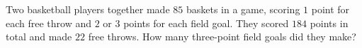 Two basketball players together made $85$ baskets in a game, scoring $1$ point for each free throw and $2$ or $3$ points for each field goal. They scored $184$ points in total and made $22$ free throws. How many three-point field goals did they make?
